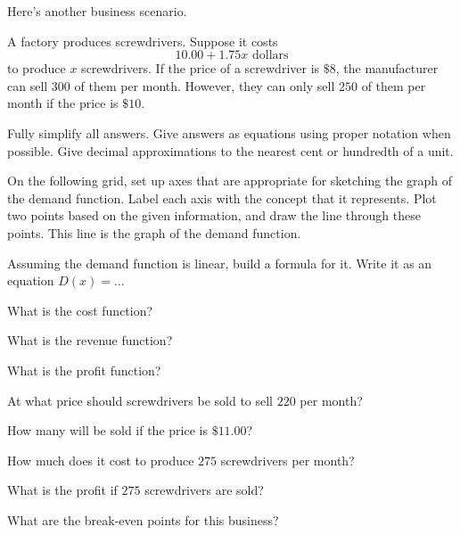 Here's another business scenario.

A factory produces screwdrivers. Suppose it costs
\begin{equation*}
 10.00 + 1.75 x \text{ dollars}
\end{equation*}
to produce $x$ screwdrivers.
If the price of a screwdriver is $\$8$, the manufacturer can sell $300$ of them per month.
However, they can only sell $250$ of them per month if the price is $\$10$.

Fully simplify all answers.
Give answers as equations using proper notation when possible.
Give decimal approximations to the nearest cent or hundredth of a unit.

\begin{ProblemSet}
 \begin{Problem}[pencil space=0.5in]
  On the following grid, set up axes that are appropriate for sketching the graph of the demand function.
  Label each axis with the concept that it represents.
  Plot two points based on the given information, and draw the line through these points.
  This line is the graph of the demand function.
  \vspace{0.5in}

  \GraphingGridSmall

 \end{Problem}

 \begin{Problem}
  Assuming the demand function is linear, build a formula for it.
  Write it as an equation $D(x) = \dots$
 \end{Problem}

 \begin{Problem}
  What is the cost function?
 \end{Problem}

 \begin{Problem}
  What is the revenue function?
 \end{Problem}

 \begin{Problem}
  What is the profit function?
 \end{Problem}

 \begin{Problem}
  At what price should screwdrivers be sold to sell $220$ per month?
 \end{Problem}

 \begin{Problem}
  How many will be sold if the price is $\$11.00$?
 \end{Problem}

 \begin{Problem}
  How much does it cost to produce $275$ screwdrivers per month?
 \end{Problem}

 \begin{Problem}
  What is the profit if $275$ screwdrivers are sold?
 \end{Problem}

 \begin{Problem}
  What are the break-even points for this business?
 \end{Problem}

\end{ProblemSet}

